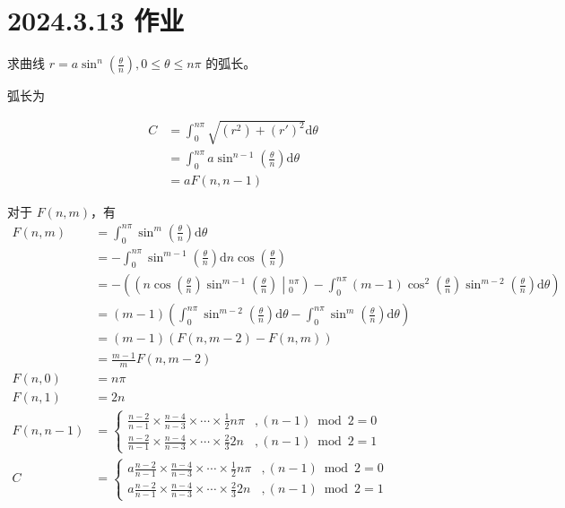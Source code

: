 \ifx\allfiles\undefined

\date{}
\author{尹锦润}

\maketitle
\fi

\section{2024.3.13 作业}

\begin{ques}
	求曲线 $\displaystyle r=a\sin^{n}\left(\frac{\theta }{n}\right) ,0\leqslant \theta \leqslant n\pi $ 的弧长。
\end{ques}



弧长为


\begin{align*}
	C & =\int _{0}^{n\pi }\sqrt{\left( r^{2}\right) +( r')^{2}}\mathrm{d} \theta \\
	& =\int _{0}^{n\pi } a\sin^{n-1}\left(\frac{\theta }{n}\right)\mathrm{d} \theta \\
	& =aF( n,n-1)
\end{align*}


对于 $\displaystyle F( n,m)$，有
\begin{align*}
	F( n,m) & =\int _{0}^{n\pi }\sin^{m}\left(\frac{\theta }{n}\right)\mathrm{d} \theta \\
	& =-\int _{0}^{n\pi }\sin^{m-1}\left(\frac{\theta }{n}\right)\mathrm{d} n\cos\left(\frac{\theta }{n}\right)\\
	& =-\left(\left( n\cos\left(\frac{\theta }{n}\right)\sin^{m-1}\left(\frac{\theta }{n}\right)\middle| _{0}^{n\pi }\right) -\int _{0}^{n\pi }( m-1)\cos^{2}\left(\frac{\theta }{n}\right)\sin^{m-2}\left(\frac{\theta }{n}\right)\mathrm{d} \theta \right)\\
	& =( m-1)\left(\int _{0}^{n\pi }\sin^{m-2}\left(\frac{\theta }{n}\right)\mathrm{d} \theta -\int _{0}^{n\pi }\sin^{m}\left(\frac{\theta }{n}\right)\mathrm{d} \theta \right)\\
	& =( m-1)( F( n,m-2) -F( n,m))\\
	& =\frac{m-1}{m} F( n,m-2)\\
	F( n,0) & =n\pi \\
	F( n,1) & =2n\\
	F( n,n-1) & =\begin{cases}
		\frac{n-2}{n-1} \times \frac{n-4}{n-3} \times \cdots \times \frac{1}{2} n\pi  & ,( n-1)\bmod 2=0\\
		\frac{n-2}{n-1} \times \frac{n-4}{n-3} \times \cdots \times \frac{2}{3} 2n & ,( n-1)\bmod 2=1
	\end{cases}\\
	C & =\begin{cases}
		a\frac{n-2}{n-1} \times \frac{n-4}{n-3} \times \cdots \times \frac{1}{2} n\pi  & ,( n-1)\bmod 2=0\\
		a\frac{n-2}{n-1} \times \frac{n-4}{n-3} \times \cdots \times \frac{2}{3} 2n & ,( n-1)\bmod 2=1
	\end{cases}
\end{align*}





